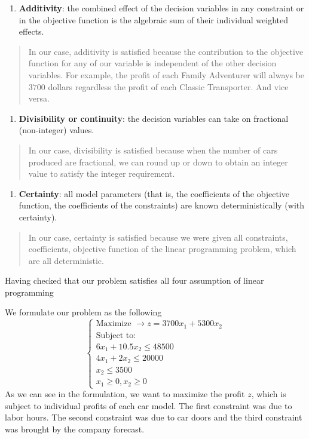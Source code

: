 \documentclass[
]{article}
\providecommand{\tightlist}{%
  \setlength{\itemsep}{0pt}\setlength{\parskip}{0pt}}
\begin{document}
\begin{enumerate}
\def\labelenumi{\arabic{enumi}.}
\setcounter{enumi}{1}
\tightlist
\item
  \textbf{Additivity}: the combined effect of the decision variables in
  any constraint or in the objective function is the algebraic sum of
  their individual weighted effects.
\end{enumerate}

\begin{quote}
In our case, additivity is satisfied because the contribution to the
objective function for any of our variable is independent of the other
decision variables. For example, the profit of each Family Adventurer
will always be \(3700\) dollars regardless the profit of each Classic
Transporter. And vice versa.
\end{quote}

\begin{enumerate}
\def\labelenumi{\arabic{enumi}.}
\setcounter{enumi}{2}
\tightlist
\item
  \textbf{Divisibility or continuity}: the decision variables can take
  on fractional (non-integer) values.
\end{enumerate}

\begin{quote}
In our case, divisibility is satisfied because when the number of cars
produced are fractional, we can round up or down to obtain an integer
value to satisfy the integer requirement.
\end{quote}

\begin{enumerate}
\def\labelenumi{\arabic{enumi}.}
\setcounter{enumi}{3}
\tightlist
\item
  \textbf{Certainty}: all model parameters (that is, the coefficients of
  the objective function, the coefficients of the constraints) are known
  deterministically (with certainty).
\end{enumerate}

\begin{quote}
In our case, certainty is satisfied because we were given all
constraints, coefficients, objective function of the linear programming
problem, which are all deterministic.
\end{quote}

Having checked that our problem satisfies all four assumption of linear
programming

We formulate our problem as the following \[
\begin{cases}
        \text{Maximize  } \rightarrow z = 3700x_1 + 5300x_2\\
        \text{Subject to:}\\
        6x_1 +10.5x_2 \leq 48500\\
        4x_1 + 2x_2 \leq 20000\\
        x_2 \leq 3500\\
        x_1 \geq 0, x_2 \geq 0
 \end{cases}
\] As we can see in the formulation, we want to maximize the profit
\(z\), which is subject to individual profits of each car model. The
first constraint was due to labor hours. The second constraint was due
to car doors and the third constraint was brought by the company
forecast.
\end{document}
